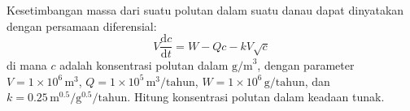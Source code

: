 \begin{soal}
\label{chapra_exe_6.25}
Kesetimbangan massa dari suatu polutan dalam suatu danau
dapat dinyatakan dengan persamaan diferensial:
\begin{equation}
V\frac{\mathrm{d}c}{\mathrm{d}t} = W - Qc - kV\sqrt{c}
\end{equation}
di mana $c$ adalah konsentrasi polutan dalam $\mathrm{g/m}^{3}$,
dengan parameter
$V = 1\times10^6\,\mathrm{m}^3$,
$Q = 1\times10^5\,\mathrm{m}^3/\mathrm{tahun}$,
$W = 1\times10^6\,\mathrm{g}/\mathrm{tahun}$, dan
$k = 0.25\,\mathrm{m}^{0.5}/\mathrm{g}^{0.5}/\mathrm{tahun}$.
Hitung konsentrasi polutan dalam keadaan tunak.
\end{soal}